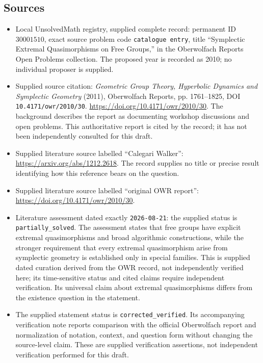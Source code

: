 \documentclass[11pt]{article}
\begin{document}
\subsection{Sources}
\begin{itemize}
\item Local UnsolvedMath registry, supplied complete record: permanent ID \(30001510\), exact source problem code \texttt{catalogue entry}, title ``Symplectic Extremal Quasimorphisms on Free Groups,'' in the Oberwolfach Reports Open Problems collection. The proposed year is recorded as 2010; no individual proposer is supplied.
\item Supplied source citation: \emph{Geometric Group Theory, Hyperbolic Dynamics and Symplectic Geometry} (2011), Oberwolfach Reports, pp. 1761--1825, DOI \texttt{10.4171/owr/2010/30}. \url{https://doi.org/10.4171/owr/2010/30}. The background describes the report as documenting workshop discussions and open problems. This authoritative report is cited by the record; it has not been independently consulted for this draft.
\item Supplied literature source labelled ``Calegari Walker'': \url{https://arxiv.org/abs/1212.2618}. The record supplies no title or precise result identifying how this reference bears on the question.
\item Supplied literature source labelled ``original OWR report'': \url{https://doi.org/10.4171/owr/2010/30}.
\item Literature assessment dated exactly \texttt{2026-08-21}: the supplied status is \texttt{partially\_solved}. The assessment states that free groups have explicit extremal quasimorphisms and broad algorithmic constructions, while the stronger requirement that every extremal quasimorphism arise from symplectic geometry is established only in special families. This is supplied dated curation derived from the OWR record, not independently verified here; its time-sensitive status and cited claims require independent verification. Its universal claim about extremal quasimorphisms differs from the existence question in the statement.
\item The supplied statement status is \texttt{corrected\_verified}. Its accompanying verification note reports comparison with the official Oberwolfach report and normalization of notation, context, and question form without changing the source-level claim. These are supplied verification assertions, not independent verification performed for this draft.
\end{itemize}
\end{document}
